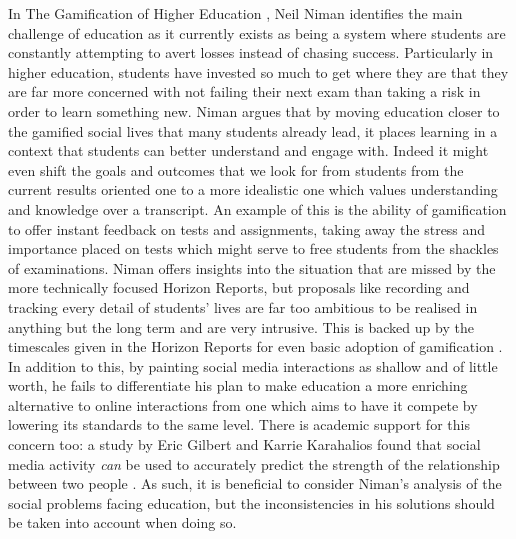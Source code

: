 \documentclass[12pt,a4paper,twoside]{report}
\begin{document}
In The Gamification of Higher Education \cite{niman2014gamification}, Neil Niman identifies the main challenge of education as it currently exists as being a system where students are constantly attempting to avert losses instead of chasing success. Particularly in higher education, students have invested so much to get where they are that they are far more concerned with not failing their next exam than taking a risk in order to learn something new. Niman argues that by moving education closer to the gamified social lives that many students already lead, it places learning in a context that students can better understand and engage with. Indeed it might even shift the goals and outcomes that we look for from students from the current results oriented one to a more idealistic one which values understanding and knowledge over a transcript. An example of this is the ability of gamification to offer instant feedback on tests and assignments, taking away the stress and importance placed on tests which might serve to free students from the shackles of examinations. Niman offers insights into the situation that are missed by the more technically focused Horizon Reports, but proposals like recording and tracking every detail of students' lives are far too ambitious to be realised in anything but the long term and are very intrusive. This is backed up by the timescales given in the Horizon Reports for even basic adoption of gamification \cite{johnson2013nmc} \cite{johnson2014nmc}. In addition to this, by painting social media interactions as shallow and of little worth, he fails to differentiate his plan to make education a more enriching alternative to online interactions from one which aims to have it compete by lowering its standards to the same level. There is academic support for this concern too: a study by Eric Gilbert and Karrie Karahalios found that social media activity \textit{can} be used to accurately predict the strength of the relationship between two people \cite{gilbert2009predicting}. As such, it is beneficial to consider Niman's analysis of the social problems facing education, but the inconsistencies in his solutions should be taken into account when doing so.
\end{document}
